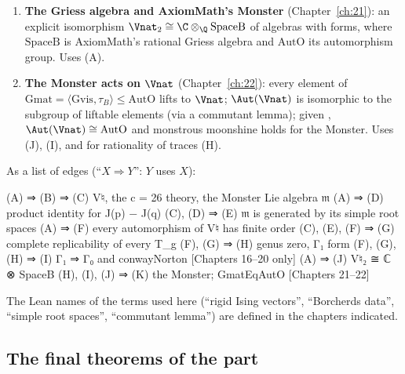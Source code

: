 \begin{enumerate}[label=(\Alph*)]
  \textbf{assembly}  (Chapter~\ref{ch:20}; recorded in \S\ref{ch16:sec:final}).  Uses (F), (G), (H).
\item\label{ch16:node:J} \textbf{The Griess algebra and AxiomMath's Monster} (Chapter~\ref{ch:21}): an explicit
  isomorphism $\Vnat_2\cong\C\otimes_\Q\mathrm{SpaceB}$ of algebras with forms, where $\mathrm{SpaceB}$ is AxiomMath's
  rational Griess algebra and $\mathrm{AutO}$ its automorphism group.  Uses (A).
\item\label{ch16:node:K} \textbf{The Monster acts on $\Vnat$} (Chapter~\ref{ch:22}): every element of
  $\mathrm{Gmat}=\langle\mathrm{Gvis},\tau_B\rangle\le\mathrm{AutO}$ lifts to $\Vnat$; $\Aut(\Vnat)$ is isomorphic to the
  subgroup of liftable elements (via a commutant lemma); given , $\Aut(\Vnat)\cong\mathrm{AutO}$ and
  monstrous moonshine holds for the Monster.  Uses (J), (I), and for rationality of traces (H).
\end{enumerate}
As a list of edges (``$X\Rightarrow Y$'': $Y$ uses $X$):
\begin{plaincode}
(A) ⇒ (B) ⇒ (C)                    V♮, the c = 26 theory, the Monster Lie algebra 𝔪
(A) ⇒ (D)                          product identity for J(p) − J(q)
(C), (D) ⇒ (E)                     𝔪 is generated by its simple root spaces
(A) ⇒ (F)                          every automorphism of V♮ has finite order
(C), (E), (F) ⇒ (G)                complete replicability of every T_g
(F), (G) ⇒ (H)                     genus zero, Γ₁ form
(F), (G), (H) ⇒ (I)                Γ₁ ⇒ Γ₀ and conwayNorton        [Chapters 16–20 only]
(A) ⇒ (J)                          V♮₂ ≅ ℂ ⊗ SpaceB
(H), (I), (J) ⇒ (K)                the Monster; GmatEqAutO          [Chapters 21–22]
\end{plaincode}
The Lean names of the terms used here (``rigid Ising vectors'', ``Borcherds data'', ``simple root spaces'', ``commutant
lemma'') are defined in the chapters indicated.

\subsection{The final theorems of the part}

